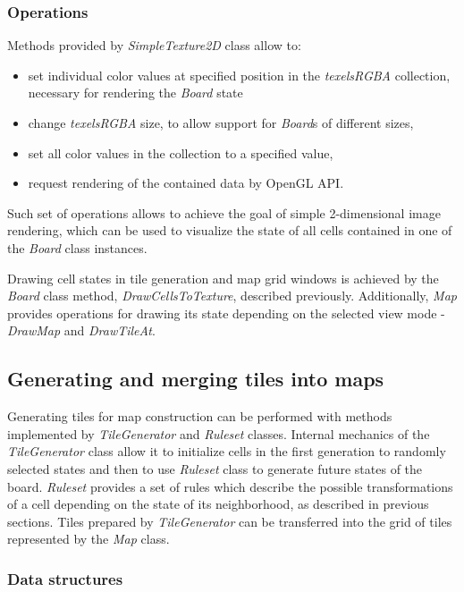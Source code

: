 \documentclass[12pt]{report}
\begin{document}
\subsubsection{Operations}

Methods provided by \textit{SimpleTexture2D} class allow to:

\begin{itemize}
	\item set individual color values at specified position in the \textit{texelsRGBA} collection, necessary for rendering the \textit{Board} state
	\item change \textit{texelsRGBA} size, to allow support for \textit{Board}s of different sizes,
	\item set all color values in the collection to a specified value,
	\item request rendering of the contained data by OpenGL API.
\end{itemize}  

Such set of operations allows to achieve the goal of simple 2-dimensional image rendering, which can be used to visualize the state of all cells contained in one of the \textit{Board} class instances.

Drawing cell states in tile generation and map grid windows is achieved by the \textit{Board} class method, \textit{DrawCellsToTexture}, described previously. Additionally, \textit{Map} provides operations for drawing its state depending on the selected view mode - \textit{DrawMap} and \textit{DrawTileAt}.

\subsection{Generating and merging tiles into maps}

Generating tiles for map construction can be performed with methods implemented by \textit{TileGenerator} and \textit{Ruleset} classes. Internal mechanics of the \textit{TileGenerator} class allow it to initialize cells in the first generation to randomly selected states and then to use \textit{Ruleset} class to generate future states of the board. \textit{Ruleset} provides a set of rules which describe the possible transformations of a cell depending on the state of its neighborhood, as described in previous sections. Tiles prepared by \textit{TileGenerator} can be transferred into the grid of tiles represented by the \textit{Map} class.

\subsubsection{Data structures} 
 
\end{document}
